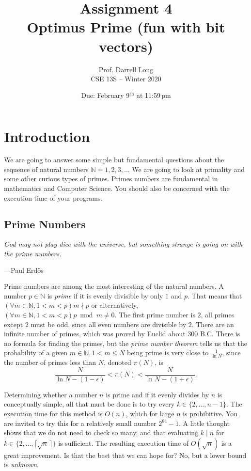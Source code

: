 \documentclass[11pt,twocolumn]{article}
\title{Assignment 4 \\ Optimus Prime (fun with bit vectors)}
\author{Prof. Darrell Long \\
CSE 13S -- Winter 2020}
\date{Due: February 9$^\text{th}$ at 11:59\,pm}
\begin{document}
\maketitle

\section{Introduction}

We are going to answer some simple but fundamental questions about
the sequence of natural numbers ${\mathbb N} = 1, 2, 3, \ldots$ We
are going to look at primality and some other curious types of primes.
Primes numbers are fundamental in mathematics and Computer Science. You should also be concerned with the execution time of your programs.

\subsection{Prime Numbers}
\textwidth
\epigraph{\emph{God may not play dice with the universe, but something strange is going on with the prime numbers.}}{---Paul Erd\"os}

\noindent Prime numbers are among the most interesting of the natural numbers.
A number $p \in \mathbb{N}$ is \emph{prime} if it is evenly divisible
by only $1$ and $p$.  That means that $(\forall m \in \mathbb{N},
1 < m < p) m \nmid p$ or alternatively, $(\forall m \in \mathbb{N},
1 < m < p)p \bmod m \ne 0$.  The first prime number is $2$, all
primes except $2$ must be odd, since all even numbers are divisible
by $2$.  There are an infinite number of primes, which was proved by Euclid
about 300 B.C.  There is no formula for finding the primes, but the
\emph{prime number theorem} tells us that the probability of a given
$m\in \mathbb{N}, 1<m\le N$ being prime is very close to $\tfrac{1}{\ln N}$, since
the number of primes less than $N$, denoted $\pi(N)$, is
$$
\frac{N}{\ln N - (1 - \epsilon)} < \pi(N) < \frac{N}{\ln N - (1 +
\epsilon)}.
$$

Determining whether a number $n$ is prime and if it evenly divides by $n$ is conceptually simple, all that must be done is to try every $k \in \{ 2, \ldots, n - 1\}$.
The execution time for this method is $O(n)$, which for large $n$ is prohibitive. You are invited to try this for a relatively small number $2^{64} - 1$.
A little thought shows that we do not need to check so many, and that evaluating
$k \mid n$ for $k\in \{2, \ldots, \lceil \sqrt{n} \,\rceil \}$ is sufficient.
The resulting execution time of $O(\sqrt{n})$ is a great improvement.
Is that the best that we can hope for? No, but a lower bound is \emph{unknown}.
\end{document}

